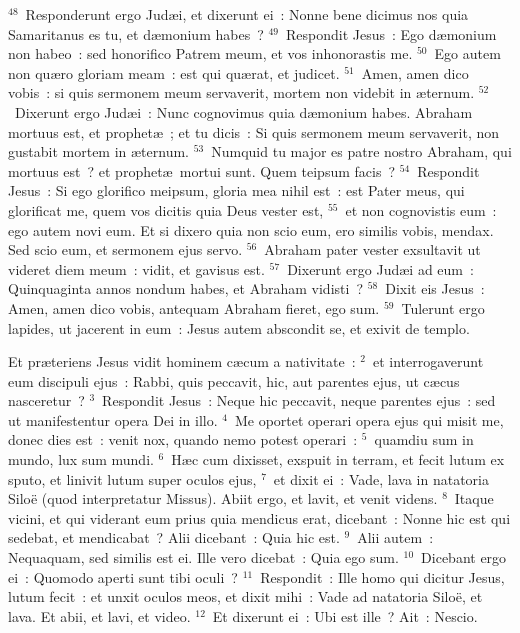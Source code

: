 ${}^{48}$~Responderunt ergo Jud\ae i, et dixerunt ei~: Nonne bene dicimus nos quia Samaritanus es tu, et d\ae monium habes~?
${}^{49}$~Respondit Jesus~: Ego d\ae monium non habeo~: sed honorifico Patrem meum, et vos inhonorastis me.
${}^{50}$~Ego autem non qu\ae ro gloriam meam~: est qui qu\ae rat, et judicet.
${}^{51}$~Amen, amen dico vobis~: si quis sermonem meum servaverit, mortem non videbit in \ae ternum.
${}^{52}$~Dixerunt ergo Jud\ae i~: Nunc cognovimus quia d\ae monium habes. Abraham mortuus est, et prophet\ae~; et tu dicis~: Si quis sermonem meum servaverit, non gustabit mortem in \ae ternum.
${}^{53}$~Numquid tu major es patre nostro Abraham, qui mortuus est~? et prophet\ae\ mortui sunt. Quem teipsum facis~?
${}^{54}$~Respondit Jesus~: Si ego glorifico meipsum, gloria mea nihil est~: est Pater meus, qui glorificat me, quem vos dicitis quia Deus vester est,
${}^{55}$~et non cognovistis eum~: ego autem novi eum. Et si dixero quia non scio eum, ero similis vobis, mendax. Sed scio eum, et sermonem ejus servo.
${}^{56}$~Abraham pater vester exsultavit ut videret diem meum~: vidit, et gavisus est.
${}^{57}$~Dixerunt ergo Jud\ae i ad eum~: Quinquaginta annos nondum habes, et Abraham vidisti~?
${}^{58}$~Dixit eis Jesus~: Amen, amen dico vobis, antequam Abraham fieret, ego sum.
${}^{59}$~Tulerunt ergo lapides, ut jacerent in eum~: Jesus autem abscondit se, et exivit de templo.

\lettrine[lines=10,image=true,loversize=0.05,lraise=-0.03]{E}{}t pr\ae teriens Jesus vidit hominem c\ae cum a nativitate~:
${}^{2}$~et interrogaverunt eum discipuli ejus~: Rabbi, quis peccavit, hic, aut parentes ejus, ut c\ae cus nasceretur~?
${}^{3}$~Respondit Jesus~: Neque hic peccavit, neque parentes ejus~: sed ut manifestentur opera Dei in illo.
${}^{4}$~Me oportet operari opera ejus qui misit me, donec dies est~: venit nox, quando nemo potest operari~:
${}^{5}$~quamdiu sum in mundo, lux sum mundi.
${}^{6}$~H\ae c cum dixisset, exspuit in terram, et fecit lutum ex sputo, et linivit lutum super oculos ejus,
${}^{7}$~et dixit ei~: Vade, lava in natatoria Silo\"e (quod interpretatur Missus). Abiit ergo, et lavit, et venit videns.
${}^{8}$~Itaque vicini, et qui viderant eum prius quia mendicus erat, dicebant~: Nonne hic est qui sedebat, et mendicabat~? Alii dicebant~: Quia hic est.
${}^{9}$~Alii autem~: Nequaquam, sed similis est ei. Ille vero dicebat~: Quia ego sum.
${}^{10}$~Dicebant ergo ei~: Quomodo aperti sunt tibi oculi~?
${}^{11}$~Respondit~: Ille homo qui dicitur Jesus, lutum fecit~: et unxit oculos meos, et dixit mihi~: Vade ad natatoria Silo\"e, et lava. Et abii, et lavi, et video.
${}^{12}$~Et dixerunt ei~: Ubi est ille~? Ait~: Nescio.


